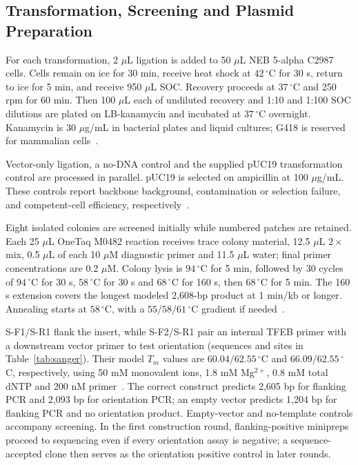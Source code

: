 \subsection{Transformation, Screening and Plasmid Preparation}
For each transformation, 2 $\mu$L ligation is added to 50 $\mu$L NEB 5-alpha C2987 cells. Cells remain on ice for 30 min, receive heat shock at $42\,^{\circ}$C for 30 s, return to ice for 5 min, and receive 950 $\mu$L SOC. Recovery proceeds at $37\,^{\circ}$C and 250 rpm for 60 min. Then 100 $\mu$L each of undiluted recovery and 1:10 and 1:100 SOC dilutions are plated on LB-kanamycin and incubated at $37\,^{\circ}$C overnight. Kanamycin is 30 $\mu$g/mL in bacterial plates and liquid cultures; G418 is reserved for mammalian cells~\cite{MethodM07,MethodM08}.

Vector-only ligation, a no-DNA control and the supplied pUC19 transformation control are processed in parallel. pUC19 is selected on ampicillin at 100 $\mu$g/mL. These controls report backbone background, contamination or selection failure, and competent-cell efficiency, respectively~\cite{MethodM08}.

Eight isolated colonies are screened initially while numbered patches are retained. Each 25 $\mu$L OneTaq M0482 reaction receives trace colony material, 12.5 $\mu$L $2\times$ mix, 0.5 $\mu$L of each 10 $\mu$M diagnostic primer and 11.5 $\mu$L water; final primer concentrations are 0.2 $\mu$M. Colony lysis is $94\,^{\circ}$C for 5 min, followed by 30 cycles of $94\,^{\circ}$C for 30 s, $58\,^{\circ}$C for 30 s and $68\,^{\circ}$C for 160 s, then $68\,^{\circ}$C for 5 min. The 160 s extension covers the longest modeled 2,608-bp product at 1 min/kb or longer. Annealing starts at $58\,^{\circ}$C, with a $55/58/61\,^{\circ}$C gradient if needed~\cite{MethodM12}.

S-F1/S-R1 flank the insert, while S-F2/S-R1 pair an internal TFEB primer with a downstream vector primer to test orientation (sequences and sites in Table~\ref{tab:sanger}). Their model $T_m$ values are $60.04/62.55\,^{\circ}$C and $66.09/62.55\,^{\circ}$C, respectively, using 50 mM monovalent ions, 1.8 mM Mg$^{2+}$, 0.8 mM total dNTP and 200 nM primer~\cite{Primer3API}. The correct construct predicts 2,605 bp for flanking PCR and 2,093 bp for orientation PCR; an empty vector predicts 1,204 bp for flanking PCR and no orientation product. Empty-vector and no-template controls accompany screening. In the first construction round, flanking-positive minipreps proceed to sequencing even if every orientation assay is negative; a sequence-accepted clone then serves as the orientation positive control in later rounds.

